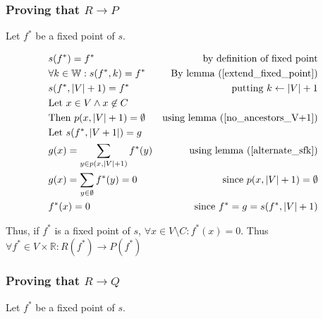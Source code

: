 \documentclass[11pt]{article}
\begin{document}
\subsubsection{Proving that $R\rightarrow P$}

Let $f^{*}$ be a fixed point of $s$.

\begin{align*}
& \text{$s(f^{*})=f^{*}$} & \text{by definition of fixed point} \\
& \text{$\forall k \in\mathbb{W}: s(f^{*},k) = f^{*}$} & \text{By lemma (\ref{extend_fixed_point})} \\
& \text{$s(f^{*},|V|+1)=f^{*}$} & \text{putting $k\leftarrow |V|+1$} \\
& \text{Let $x\in V \land x \not \in C$} & \text{} \\
& \text{Then $p(x,|V|+1) = \emptyset$} & \text{using lemma (\ref{no_ancestors_V+1})} \\
& \text{Let $s(f^{*},|V+1|) = g$} & \text{} \\
& \text{$g(x) = \sum_{y \in p(x,|V|+1)} f^{*}(y)$} & \text{using lemma (\ref{alternate_sfk})} \\
& \text{$g(x) = \sum_{y \in \emptyset} f^{*}(y) = 0$} & \text{since $p(x,|V|+1) = \emptyset$} \\
& \text{$f^{*}(x)=0$} & \text{since $f^{*}=g=s(f^{*},|V|+1)$}
\end{align*}

Thus, if $f^{*}$ is a fixed point of $s$, $\forall x \in V \setminus C: f^{*}(x) = 0$. Thus $\forall f^{*} \in V \times \mathbb{R}: R(f^{*}) \rightarrow P(f^{*})$


\subsubsection{Proving that $R\rightarrow Q$}

Let $f^{*}$ be a fixed point of $s$.
\end{document}
